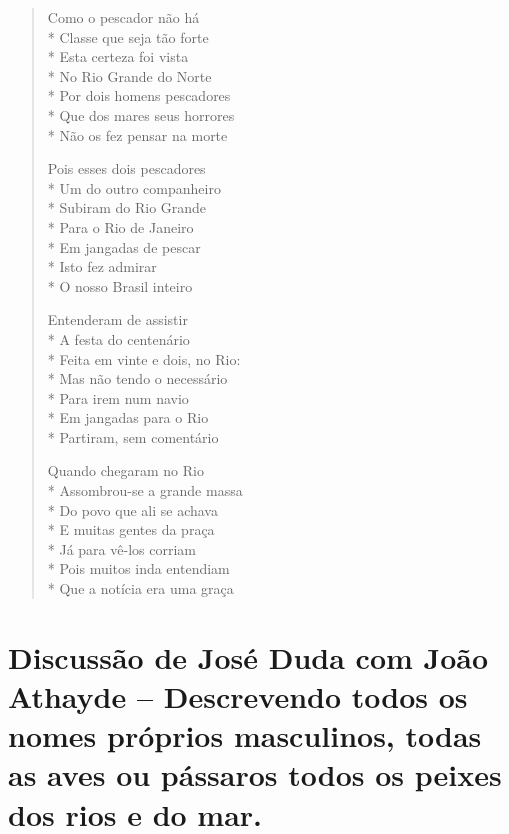 \begin{verse}
Como o pescador não há\\*
Classe que seja tão forte\\*
Esta certeza foi vista\\*
No Rio Grande do Norte\\*
Por dois homens pescadores\\*
Que dos mares seus horrores\\*
Não os fez pensar na morte

Pois esses dois pescadores\\*
Um do outro companheiro\\*
Subiram do Rio Grande\\*
Para o Rio de Janeiro\\*
Em jangadas de pescar\\*
Isto fez admirar\\*
O nosso Brasil inteiro

Entenderam de assistir\\*
A festa do centenário\\*
Feita em vinte e dois, no Rio:\\*
Mas não tendo o necessário\\*
Para irem num navio\\*
Em jangadas para o Rio\\*
Partiram, sem comentário

Quando chegaram no Rio\\*
Assombrou-se a grande massa\\*
Do povo que ali se achava\\*
E muitas gentes da praça\\*
Já para vê-los corriam\\*
Pois muitos inda entendiam\\*
Que a notícia era uma graça

\end{verse}

\chapter[Discussão de José Duda com João Athayde]{Discussão de José Duda com João Athayde --
Descrevendo todos os nomes próprios
masculinos, todas as aves ou pássaros
todos os peixes dos rios e do mar.}


